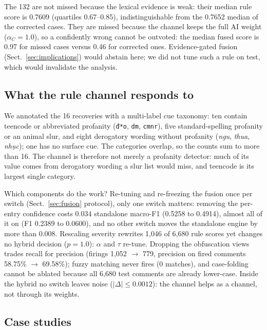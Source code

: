 The 132 are not missed because the lexical evidence is weak: their median rule
\hate{} score is 0.7609 (quartiles 0.67--0.85), indistinguishable from the 0.7652
median of the corrected cases. They are missed because the \clean{} channel keeps the
full AI weight ($\alpha_C=1.0$), so a confidently wrong \clean{} cannot be outvoted:
the median fused \clean{} score is 0.97 for missed cases versus 0.46 for corrected
ones.
Evidence-gated fusion (Sect.~\ref{sec:implications}) would abstain here; we did not tune
such a rule on test, which would invalidate the analysis.

\subsection{What the rule channel responds to}
\label{sec:cue-taxonomy}

We annotated the 16 \hate{} recoveries with a multi-label cue taxonomy: ten
contain teencode or abbreviated profanity (\texttt{đ*o}, \texttt{dm},
\texttt{cmnr}), five
standard-spelling profanity or an animal slur, and eight derogatory wording without
profanity (\emph{ngu}, \emph{thua}, \emph{nhục}); one has no surface cue. The
categories overlap, so the counts sum to more than 16. The channel is therefore not
merely a profanity detector: much of its value comes from derogatory wording a slur
list would miss, and teencode is its largest single category.

Which components do the work? Re-tuning and re-freezing the fusion once per switch
(Sect.~\ref{sec:fusion} protocol), only one switch matters: removing the per-entry
confidence costs 0.034 standalone macro-F1 (0.5258 to 0.4914), almost all of it on
\off{} (F1 0.2389 to 0.0600), and no other switch moves the standalone engine by more
than 0.008. Rescaling severity rewrites 1{,}046 of 6{,}680 rule scores yet changes no
hybrid decision ($p=1.0$): $\alpha$ and $\tau$ re-tune. Dropping the obfuscation
views trades recall for precision (firings
1{,}052 $\to$ 779, precision on fired comments 58.75\% $\to$ 69.58\%); fuzzy matching
never fires (0 matches), and case-folding cannot be ablated because all 6{,}680 test
comments are already lower-case. Inside the hybrid no switch leaves noise
($|\Delta|\le0.0012$): the channel helps as a channel, not through its weights.

\subsection{Case studies}
\label{sec:cases}

